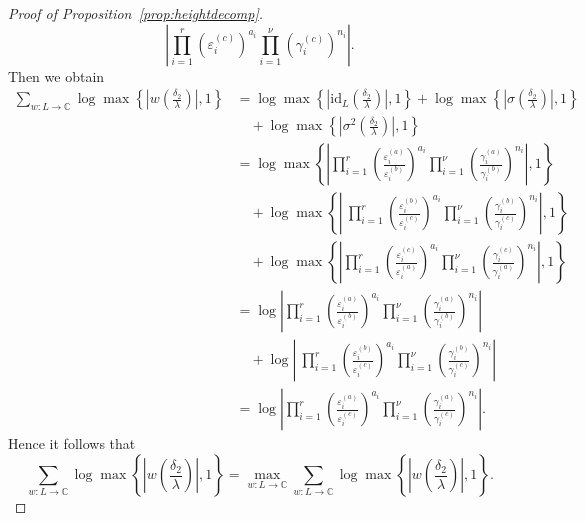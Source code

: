 \begin{proof}[Proof of Proposition~\ref{prop:heightdecomp}]
\[	\left|\prod_{i = 1}^{r}\left( \varepsilon_i^{(c)}\right)^{a_i} \prod_{i = 1}^{\nu} \left( \gamma_i^{(c)}\right)^{n_i}\right|.\]
Then we obtain
\begin{align*}
\sum_{w :L \to \mathbb{C}} \log \max \left\{ \left|w\left(\frac{\delta_2}{\lambda}\right)\right|, 1\right\}
	& = \log \max \left\{ \left|\text{id}_L\left(\frac{\delta_2}{\lambda}\right)\right|, 1\right\} 
		+ \log \max \left\{ \left|\sigma\left(\frac{\delta_2}{\lambda}\right)\right|,1\right\} \\
		& \quad+ \log \max \left\{ \left|\sigma^2\left(\frac{\delta_2}{\lambda}\right)\right|, 1\right\}\\
	& = \log \max \left\{ \left|\prod_{i = 1}^{r}\left( \frac{\varepsilon_i^{(a)}}{\varepsilon_i^{(b)}}\right)^{a_i} \prod_{i = 1}^{\nu} \left( \frac{\gamma_i^{(a)}}{\gamma_i^{(b)}}\right)^{n_i} \right|, 1\right\} \\
		& \quad + \log \max \left\{ \left|\ \prod_{i = 1}^{r}\left( \frac{\varepsilon_i^{(b)}}{\varepsilon_i^{(c)}}\right)^{a_i} \prod_{i = 1}^{\nu} \left( \frac{\gamma_i^{(b)}}{\gamma_i^{(c)}}\right)^{n_i} \right|,1\right\} \\
		& \quad+ \log \max \left\{ \left| \prod_{i = 1}^{r}\left( \frac{\varepsilon_i^{(c)}}{\varepsilon_i^{(a)}}\right)^{a_i} \prod_{i = 1}^{\nu} \left( \frac{\gamma_i^{(c)}}{\gamma_i^{(a)}}\right)^{n_i} \right|, 1\right\}\\
	& = \log  \left|\prod_{i = 1}^{r}\left( \frac{\varepsilon_i^{(a)}}{\varepsilon_i^{(b)}}\right)^{a_i} \prod_{i = 1}^{\nu} \left( \frac{\gamma_i^{(a)}}{\gamma_i^{(b)}}\right)^{n_i} \right| \\
		& \quad + \log \left|\ \prod_{i = 1}^{r}\left( \frac{\varepsilon_i^{(b)}}{\varepsilon_i^{(c)}}\right)^{a_i} \prod_{i = 1}^{\nu} \left( \frac{\gamma_i^{(b)}}{\gamma_i^{(c)}}\right)^{n_i} \right| \\
	& = \log  \left|\prod_{i = 1}^{r}\left( \frac{\varepsilon_i^{(a)}}{\varepsilon_i^{(c)}}\right)^{a_i} \prod_{i = 1}^{\nu} \left( \frac{\gamma_i^{(a)}}{\gamma_i^{(c)}}\right)^{n_i} \right|.
\end{align*}
Hence it follows that
\[\sum_{w :L \to \mathbb{C}} \log \max \left\{ \left|w\left(\frac{\delta_2}{\lambda}\right)\right|, 1\right\} = 
\max_{w:L\to \mathbb{C}}\sum_{w :L \to \mathbb{C}} \log \max \left\{ \left|w\left(\frac{\delta_2}{\lambda}\right)\right|, 1\right\}.\]


\end{proof}
